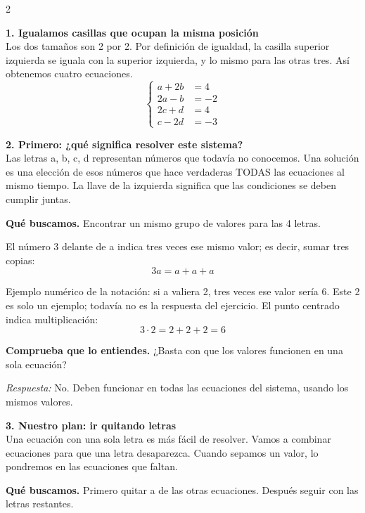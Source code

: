 \documentclass[11pt,a4paper,landscape]{article}
\begin{document}
\begin{multicols*}{2}
\noindent\begin{minipage}{\linewidth}\textbf{1. Igualamos casillas que ocupan la misma posición}\\[2pt]Los dos tamaños son 2 por 2. Por definición de igualdad, la casilla superior izquierda se iguala con la superior izquierda, y lo mismo para las otras tres. Así obtenemos cuatro ecuaciones.
\[\left\{\begin{aligned}a+2b&=4\\2a-b&=-2\\2c+d&=4\\c-2d&=-3\end{aligned}\right.\]
\end{minipage}\par\medskip
\noindent\begin{minipage}{\linewidth}\textbf{2. Primero: ¿qué significa resolver este sistema?}\\[2pt]Las letras a, b, c, d representan números que todavía no conocemos. Una solución es una elección de esos números que hace verdaderas TODAS las ecuaciones al mismo tiempo. La llave de la izquierda significa que las condiciones se deben cumplir juntas.
\par\smallskip\textbf{Qué buscamos.} Encontrar un mismo grupo de valores para las 4 letras.
\par\smallskip El número 3 delante de a indica tres veces ese mismo valor; es decir, sumar tres copias:
\[3a=a+a+a\]
\par\smallskip Ejemplo numérico de la notación: si a valiera 2, tres veces ese valor sería 6. Este 2 es solo un ejemplo; todavía no es la respuesta del ejercicio. El punto centrado indica multiplicación:
\[3\cdot 2=2+2+2=6\]
\par\smallskip\textbf{Comprueba que lo entiendes.} ¿Basta con que los valores funcionen en una sola ecuación?\par\textit{Respuesta:} No. Deben funcionar en todas las ecuaciones del sistema, usando los mismos valores.
\end{minipage}\par\medskip
\noindent\begin{minipage}{\linewidth}\textbf{3. Nuestro plan: ir quitando letras}\\[2pt]Una ecuación con una sola letra es más fácil de resolver. Vamos a combinar ecuaciones para que una letra desaparezca. Cuando sepamos un valor, lo pondremos en las ecuaciones que faltan.
\par\smallskip\textbf{Qué buscamos.} Primero quitar a de las otras ecuaciones. Después seguir con las letras restantes.

\end{minipage}
\end{multicols*}
\end{document}
